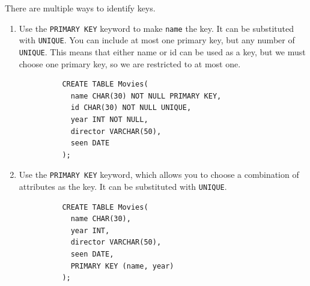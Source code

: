    \begin{definition}
      \label{def:primary-key-unique-key-constraints}
      There are multiple ways to identify keys. 
      \begin{enumerate}
        \item Use the \texttt{PRIMARY KEY} keyword to make \texttt{name} the key. It can be substituted with \texttt{UNIQUE}. You can include at most one primary key, but any number of \texttt{UNIQUE}. This means that either name or id can be used as a key, but we must choose one primary key, so we are restricted to at most one. 
        \begin{lstlisting}
          CREATE TABLE Movies(
            name CHAR(30) NOT NULL PRIMARY KEY,
            id CHAR(30) NOT NULL UNIQUE,
            year INT NOT NULL, 
            director VARCHAR(50), 
            seen DATE
          ); 
        \end{lstlisting}

        \item Use the \texttt{PRIMARY KEY} keyword, which allows you to choose a combination of attributes as the key. It can be substituted with \texttt{UNIQUE}. 
        \begin{lstlisting}
          CREATE TABLE Movies(
            name CHAR(30),
            year INT, 
            director VARCHAR(50), 
            seen DATE, 
            PRIMARY KEY (name, year)
          ); 
        \end{lstlisting}
      \end{enumerate}
    \end{definition}


